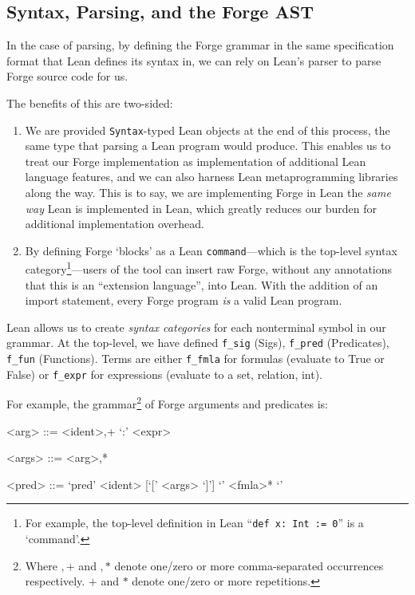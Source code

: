 \subsection{Syntax, Parsing, and the Forge AST}\label{sec:parsing}
In the case of parsing, by defining the Forge grammar in the same specification format that Lean defines its syntax in, we can rely on Lean's parser to parse Forge source code for us.

The benefits of this are two-sided:
\begin{enumerate}
  \item We are provided \texttt{Syntax}-typed Lean objects at the end of this process, the same type that parsing a Lean program would produce. This enables us to treat our Forge implementation as implementation of additional Lean language features, and we can also harness Lean metaprogramming libraries along the way. This is to say, we are implementing Forge in Lean the \emph{same way} Lean is implemented in Lean, which greatly reduces our burden for additional implementation overhead.
  \item By defining Forge `blocks' as a Lean \texttt{command}---which is the top-level syntax category\footnote{For example, the top-level definition in Lean ``\texttt{def x: Int := 0}'' is a `command'.}---users of the tool can insert raw Forge, without any annotations that this is an ``extension language'', into Lean. With the addition of an import statement, every Forge program \emph{is} a valid Lean program.
\end{enumerate}

Lean allows us to create \emph{syntax categories} for each nonterminal symbol in our grammar. At the top-level, we have defined \texttt{f\_sig} (Sigs), \texttt{f\_pred} (Predicates), \texttt{f\_fun} (Functions). Terms are either \texttt{f\_fmla} for formulas (evaluate to True or False) or \texttt{f\_expr} for expressions (evaluate to a set, relation, int).

For example, the grammar\footnote{Where $,+$ and $,*$ denote one/zero or more comma-separated occurrences respectively. $+$ and $*$ denote one/zero or more repetitions.} of Forge arguments and predicates is:

\vspace{1em}\begin{center}
\begin{minipage}{0.8\textwidth}
\setlength{\grammarindent}{6em}
\begin{grammar}
<arg> ::= <ident>,+ `:' <expr>

<args> ::= <arg>,*

<pred> ::= `pred' <ident> [`[' <args> `]'] `{' <fmla>* `}'
\end{grammar}
\end{minipage}
\end{center}

